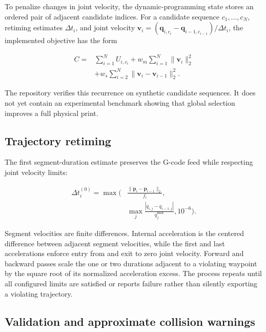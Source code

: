 \documentclass[letterpaper,10pt,conference]{ieeeconf}
\begin{document}
To penalize changes in joint velocity, the dynamic-programming state stores an
ordered pair of adjacent candidate indices.  For a candidate sequence
\(c_1,\ldots,c_N\), retiming estimates \(\Delta t_i\), and joint velocity
\(\bm v_i=(\bm q_{i,c_i}-\bm q_{i-1,c_{i-1}})/\Delta t_i\), the implemented
objective has the form

\begin{equation}
  \begin{aligned}
  C ={}& \sum_{i=1}^{N} U_{i,c_i}
  + w_m\sum_{i=1}^{N}\lVert\bm v_i\rVert_2^2 \\
  &+ w_s\sum_{i=2}^{N}\lVert\bm v_i-\bm v_{i-1}\rVert_2^2.
  \end{aligned}
  \label{eq:dp}
\end{equation}

The repository verifies this recurrence on synthetic candidate sequences.  It
does not yet contain an experimental benchmark showing that global selection
improves a full physical print.

\subsection{Trajectory retiming}

The first segment-duration estimate preserves the G-code feed while respecting
joint velocity limits:

\begin{equation}
  \begin{aligned}
  \Delta t_i^{(0)} = \max\!\Bigg(&
  \frac{\lVert\bm p_i-\bm p_{i-1}\rVert_2}{f_i},\\
  &\max_j\frac{|q_{i,j}-q_{i-1,j}|}{\dot q_j^{\max}},
  10^{-6}\Bigg).
  \end{aligned}
  \label{eq:retime}
\end{equation}

Segment velocities are finite differences.  Internal acceleration is the
centered difference between adjacent segment velocities, while the first and
last accelerations enforce entry from and exit to zero joint velocity.  Forward
and backward passes scale the one or two durations adjacent to a violating
waypoint by the square root of its normalized acceleration excess.  The process
repeats until all configured limits are satisfied or reports failure rather
than silently exporting a violating trajectory.

\subsection{Validation and approximate collision warnings}
\end{document}
